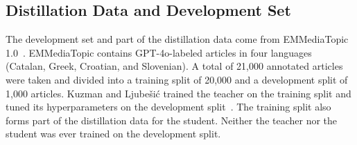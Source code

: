 \documentclass{ieeeaccess}
\begin{document}
\begin{table}[!t]
\caption{Data Sets of the Study and Their Roles}
\label{tab:datasets}
\centering
\footnotesize
\setlength{\tabcolsep}{3pt}
\end{table}

\subsection{Distillation Data and Development Set}
\label{sec:distdata}
The development set and part of the distillation data come from EMMediaTopic 1.0~\cite{emmediatopic2025,kuzman2025llm}. EMMediaTopic contains GPT-4o-labeled articles in four languages (Catalan, Greek, Croatian, and Slovenian). A total of 21,000 annotated articles were taken and divided into a training split of 20,000 and a development split of 1,000 articles. Kuzman and Ljube\v{s}i\'c trained the teacher on the training split and tuned its hyperparameters on the development split~\cite{kuzman2025llm}. The training split also forms part of the distillation data for the student. Neither the teacher nor the student was ever trained on the development split.
\end{document}
